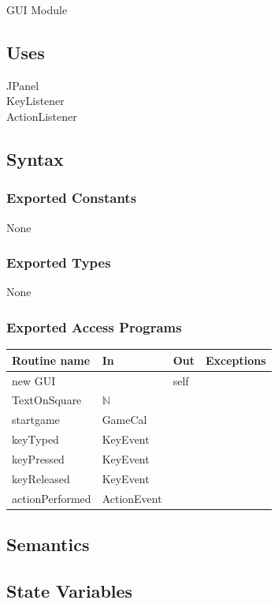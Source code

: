 \documentclass[12pt]{article}
\begin{document}
GUI Module

\subsection* {Uses}

JPanel\\
KeyListener\\
ActionListener\\

\subsection* {Syntax}

\subsubsection* {Exported Constants}

None

\subsubsection* {Exported Types}

None


\subsubsection* {Exported Access Programs}

\begin{tabular}{| l | l | l | p{6cm} |}
\hline
\textbf{Routine name} & \textbf{In} & \textbf{Out} & \textbf{Exceptions}\\
\hline
new GUI & & self& \\
\hline
TextOnSquare & $\mathbb{N}$ &  & \\
\hline
startgame & GameCal &  & \\
\hline
keyTyped & KeyEvent &  & \\
\hline
keyPressed & KeyEvent & & \\
\hline
keyReleased & KeyEvent &  & \\
\hline
actionPerformed & ActionEvent & & \\
\hline
\end{tabular}

\subsection* {Semantics}

\subsection* {State Variables}
\end{document}
